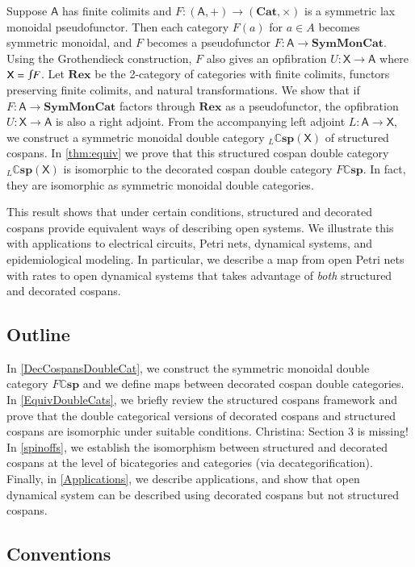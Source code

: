 \documentclass[reqno]{amsart}
\let\maps\colon
\theoremstyle{definition}
\theoremstyle{remark}
\def\purple{\color{purple(x11)}}
\def\chris{\purple Christina: }
\newcommand{\A}{\mathsf{A}}
\newcommand{\X}{\mathsf{X}}
\newcommand{\bicat}{\mathbf}
\newcommand{\Cat}{\bicat{Cat}}
\newcommand{\Rex}{\bicat{Rex}}
\newcommand{\SMC}{\bicat{SymMonCat}}
\newcommand{\double}[1]{\mathbf{\mathbb #1}}
\newcommand{\lCsp}{\double{Csp}}
\newcommand{\inta}{\raisebox{.3\depth}{$\smallint\hspace{-.01in}$}}
\begin{document}
Suppose $\A$ has finite colimits and $F \maps (\A , +) \to (\Cat, \times)$ is a symmetric lax monoidal pseudofunctor.  Then each category $F(a)$ for $a \in A$ becomes symmetric monoidal, and $F$ becomes a pseudofunctor $F \maps \A \to \SMC$.    Using the Grothendieck construction, $F$ also gives an opfibration $U \maps \X \to \A$ where $\X = \inta F$.   Let $\Rex$ be the 2-category of categories with finite colimits, functors preserving finite colimits, and natural transformations.  We show that if $F \maps \A \to \SMC$ factors through $\Rex$ as a pseudofunctor, the opfibration $U \maps \X \to \A$ is also a right adjoint.   From the accompanying left adjoint $L \maps \A \to \X$, we  construct a symmetric monoidal double category ${}_L \lCsp(\X)$ of structured cospans.  In \cref{thm:equiv} we prove that this structured cospan double category ${}_L \lCsp(\X)$ is isomorphic to the decorated cospan double category $F \lCsp$.   In fact, they are isomorphic as symmetric monoidal double categories.

This result shows that under certain conditions, structured and decorated cospans provide equivalent ways of describing open systems.  We illustrate this with applications to electrical circuits, Petri nets, dynamical systems, and epidemiological modeling.  In particular, we describe a map from open Petri nets with rates to open dynamical systems that takes advantage of \emph{both} structured and decorated cospans.

\subsection*{Outline}

In \cref{DecCospansDoubleCat}, we construct the symmetric monoidal double category $F\lCsp$ and we define maps between decorated cospan double categories. In \cref{EquivDoubleCats}, we briefly review the structured cospans framework and prove that the double categorical versions of decorated cospans and structured cospans are isomorphic under suitable conditions. {\chris Section 3 is missing!} In \cref{spinoffs}, we establish the isomorphism between structured and decorated cospans at the level of bicategories and categories (via decategorification).  Finally, in \cref{Applications}, we describe applications, and show that open dynamical system can be described using decorated cospans but not structured cospans.

\subsection*{Conventions}
\end{document}
